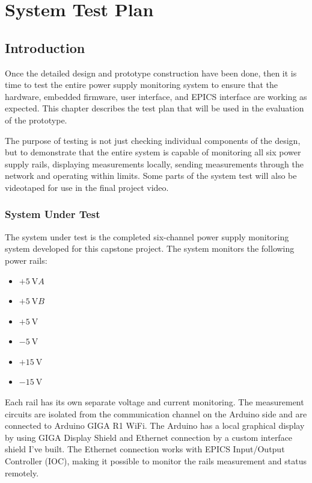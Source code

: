 \chapter{System Test Plan}
\label{ch:system-test-plan}

\section{Introduction}

Once the detailed design and prototype construction have been done, then it is time to test the
entire power supply monitoring system to ensure that the hardware, embedded firmware,
user interface, and EPICS interface are working as expected. This chapter describes the test plan
that will be used in the evaluation of the prototype.

The purpose of testing is not just checking individual components of the design, but to demonstrate that the entire system is capable of monitoring all six power supply rails,
displaying measurements locally, sending measurements through the network and operating within
limits. Some parts of the system test will also be videotaped for use in the final project video.

\subsection{System Under Test}

The system under test is the completed six-channel power supply monitoring system
developed for this capstone project. The system monitors the following power rails:

\begin{itemize}
    \item \(+\SI{5}{\volt}{A}\)
    \item \(+\SI{5}{\volt}{B}\)
    \item \(+\SI{5}{\volt}\)
    \item \(-\SI{5}{\volt}\)
    \item \(+\SI{15}{\volt}\)
    \item \(-\SI{15}{\volt}\)
\end{itemize}

Each rail has its own separate voltage and current monitoring. The measurement
circuits are isolated from the communication channel on the Arduino side and are
connected to Arduino GIGA R1 WiFi. The Arduino has a local graphical display by
using GIGA Display Shield and Ethernet connection by a custom interface shield I've built.
The Ethernet connection works with EPICS Input/Output Controller (IOC), making
it possible to monitor the rails measurement and status remotely.

